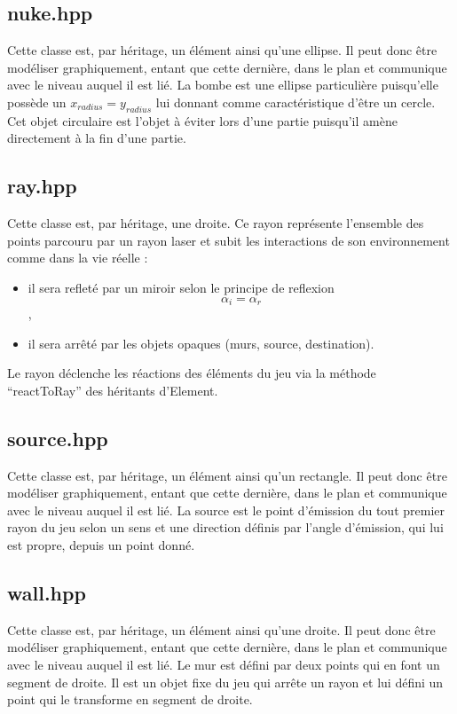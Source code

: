 \documentclass[a4paper,11pt]{report}
\begin{document}
\subsection[Bombe]{nuke.hpp}
Cette classe est, par héritage, un élément ainsi qu'une ellipse. Il peut donc
être modéliser graphiquement, entant que cette dernière, dans le plan et
communique avec le niveau auquel il est lié. La bombe est une ellipse
particulière puisqu'elle possède un $x_{radius} = y_{radius}$ lui donnant comme
caractéristique d'être un cercle. Cet objet circulaire est l'objet à éviter lors
d'une partie puisqu'il amène directement à la fin d'une partie.

\subsection[Rayon]{ray.hpp}
Cette classe est, par héritage, une droite. Ce rayon représente l'ensemble des
points parcouru par un rayon laser et subit les interactions de son
environnement comme dans la vie réelle :
\begin{itemize}
	\item il sera refleté par un miroir selon le principe de reflexion
		$$\alpha_{i} = \alpha_{r}$$,
	\item il sera arrêté par les objets opaques (murs, source, destination).
\end{itemize}

Le rayon déclenche les réactions des éléments du jeu via la méthode
``reactToRay'' des héritants d'Element.

\subsection[Source]{source.hpp}
Cette classe est, par héritage, un élément ainsi qu'un rectangle. Il peut donc
être modéliser graphiquement, entant que cette dernière, dans le plan et
communique avec le niveau auquel il est lié. La source est le point d'émission
du tout premier rayon du jeu selon un sens et une direction définis par l'angle
d'émission, qui lui est propre, depuis un point donné.

\subsection[Mur]{wall.hpp}
Cette classe est, par héritage, un élément ainsi qu'une droite. Il peut donc
être modéliser graphiquement, entant que cette dernière, dans le plan et
communique avec le niveau auquel il est lié. Le mur est défini par deux points
qui en font un segment de droite. Il est un objet fixe du jeu qui arrête un
rayon et lui défini un point qui le transforme en segment de droite.
\end{document}
